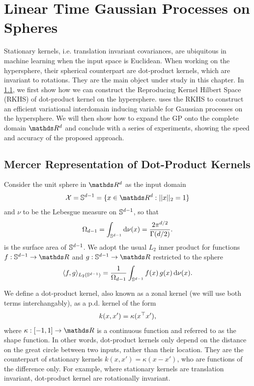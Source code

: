\ifpdf
    \graphicspath{{Chapter3/Figs/Vector/}{Chapter3/Figs/PDF/}{Chapter3/Figs/}}
\else
    \graphicspath{{Chapter3/Figs/Raster/}{Chapter3/Figs/}}
\fi


\chapter{Linear Time Gaussian Processes on Spheres}
\label{chapter:vish}

Stationary kernels, i.e. translation invariant covariances, are ubiquitous in machine learning when the input space is Euclidean. When working on the hypersphere, their spherical counterpart are dot-product kernels, which are invariant to rotations. They are the main object under study in this chapter. In \cref{sec:rkhs-dotproduct-kernels}, we first show how we can construct the Reproducing Kernel Hilbert Space (RKHS) of dot-product kernel on the hypersphere.  uses the RKHS to construct an efficient variational interdomain inducing variable for Gaussian processes on the hypersphere. We will then show how to expand the GP onto the complete domain $\Reals^d$ and conclude with a series of experiments, showing the speed and accuracy of the proposed approach.

\section{Mercer Representation of Dot-Product Kernels}
\label{sec:rkhs-dotproduct-kernels}

Consider the unit sphere in $\Reals^d$  as the input domain
\begin{equation}
    \mathcal{X} = \dsphere = \{x \in \Reals^d: \norm{x}_2 = 1\}
\end{equation}
and $\nu$ to be the Lebesgue measure on $\mathbb{S}^{d-1}$, so that
\begin{equation}
    \Omega_{d-1} = \int_{\mathbb{S}^{d-1}} \mathrm{d}{\nu(x)} = \frac{2 \pi ^ {d/2}}{\Gamma(d/2)}.
\end{equation}
is the surface area of $\mathbb{S}^{d-1}$. We adopt the usual $L_2$ inner product for functions $f: \dsphere \rightarrow \Reals$ and $g: \dsphere \rightarrow \Reals$ restricted to the sphere 
\begin{equation}
     \langle f, g\rangle_{L_{2}(\mathbb{S}^{d-1})} = \frac{1}{\Omega_{d-1}} \int_{\mathbb{S}^{d-1}} f(x)\,g(x) \, \mathrm{d}{\nu(x)}.
\end{equation}

We define a dot-product kernel, also known as a zonal kernel (we will use both terms interchangably), as a p.d. kernel of the form
\begin{equation}
    k(x, x') = \kappa(x^{\top} x'),
\end{equation}
where $\kappa: [-1, 1] \rightarrow \Reals$ is a continuous function and referred to as the shape function. In other words, dot-product kernels only depend on the distance on the great circle between two inputs, rather than their location. They are the counterpart of stationary kernels $k(x, x') = \kappa(x - x')$, who are functions of the difference only. For example, where stationary kernels are translation invariant, dot-product kernel are rotationally invariant.

